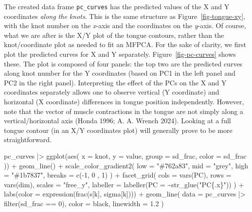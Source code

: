 \documentclass[
]{interact}
\newenvironment{Shaded}{\begin{snugshade}}{\end{snugshade}}
\newcommand{\AttributeTok}[1]{\textcolor[rgb]{0.40,0.45,0.13}{#1}}
\newcommand{\DecValTok}[1]{\textcolor[rgb]{0.68,0.00,0.00}{#1}}
\newcommand{\FloatTok}[1]{\textcolor[rgb]{0.68,0.00,0.00}{#1}}
\newcommand{\FunctionTok}[1]{\textcolor[rgb]{0.28,0.35,0.67}{#1}}
\newcommand{\NormalTok}[1]{\textcolor[rgb]{0.00,0.23,0.31}{#1}}
\newcommand{\SpecialCharTok}[1]{\textcolor[rgb]{0.37,0.37,0.37}{#1}}
\newcommand{\StringTok}[1]{\textcolor[rgb]{0.13,0.47,0.30}{#1}}
\begin{document}
The created data frame \texttt{pc\_curves} has the predicted values of
the X and Y coordinates \emph{along the knots}. This is the same
structure as Figure~\ref{fig-tongue-xy}, with the knot number on the
\emph{x}-axis and the coordinates on the \emph{y}-axis. Of course, what
we are after is the X/Y plot of the tongue contours, rather than the
knot/coordinate plot as needed to fit an MFPCA. For the sake of clarity,
we first plot the predicted curves for X and Y separately.
Figure~\ref{fig-pc-curves} shows these. The plot is composed of four
panels: the top two are the predicted curves along knot number for the Y
coordinates (based on PC1 in the left panel and PC2 in the right panel).
Interpreting the effect of the PCs on the X and Y coordinates separately
allows one to observe vertical (Y coordinate) and horizontal (X
coordinate) differences in tongue position independently. However, note
that the vector of muscle contractions in the tongue are not simply
along a vertical/horizontal axis (Honda 1996; A. A. Wrench 2024).
Looking at a full tongue contour (in an X/Y coordinates plot) will
generally prove to be more straightforward.

\label{cell-fig-pc-curves}
\begin{Shaded}
\begin{Highlighting}[]
\NormalTok{pc\_curves }\SpecialCharTok{|\textgreater{}} 
  \FunctionTok{ggplot}\NormalTok{(}\FunctionTok{aes}\NormalTok{(}
    \AttributeTok{x =}\NormalTok{ knot, }\AttributeTok{y =}\NormalTok{ value, }\AttributeTok{group =}\NormalTok{ sd\_frac, }\AttributeTok{color =}\NormalTok{ sd\_frac}
\NormalTok{  )) }\SpecialCharTok{+}
  \FunctionTok{geom\_line}\NormalTok{() }\SpecialCharTok{+}
  \FunctionTok{scale\_color\_gradient2}\NormalTok{(}
    \AttributeTok{low =} \StringTok{"\#762a83"}\NormalTok{, }\AttributeTok{mid =} \StringTok{"grey"}\NormalTok{, }\AttributeTok{high =} \StringTok{"\#1b7837"}\NormalTok{,}
    \AttributeTok{breaks =} \FunctionTok{c}\NormalTok{(}\SpecialCharTok{{-}}\DecValTok{1}\NormalTok{, }\DecValTok{0}\NormalTok{ , }\DecValTok{1}\NormalTok{)}
\NormalTok{  ) }\SpecialCharTok{+}
  \FunctionTok{facet\_grid}\NormalTok{(}
    \AttributeTok{cols =} \FunctionTok{vars}\NormalTok{(PC), }\AttributeTok{rows =} \FunctionTok{vars}\NormalTok{(dim),}
    \AttributeTok{scales =} \StringTok{"free\_y"}\NormalTok{,}
    \AttributeTok{labeller =} \FunctionTok{labeller}\NormalTok{(}\AttributeTok{PC =} \SpecialCharTok{\textasciitilde{}}\FunctionTok{str\_glue}\NormalTok{(}\StringTok{"PC\{.x\}"}\NormalTok{))}
\NormalTok{  ) }\SpecialCharTok{+}
  \FunctionTok{labs}\NormalTok{(}\AttributeTok{color =} \FunctionTok{expression}\NormalTok{(}\FunctionTok{frac}\NormalTok{(s[k], sigma[k]))) }\SpecialCharTok{+}
  \FunctionTok{geom\_line}\NormalTok{(}
    \AttributeTok{data =}\NormalTok{ pc\_curves }\SpecialCharTok{|\textgreater{}} \FunctionTok{filter}\NormalTok{(sd\_frac }\SpecialCharTok{==} \DecValTok{0}\NormalTok{),}
    \AttributeTok{color =} \StringTok{\textquotesingle{}black\textquotesingle{}}\NormalTok{, }\AttributeTok{linewidth =} \FloatTok{1.2}
\NormalTok{  )}
\end{Highlighting}
\end{Shaded}
\end{document}
